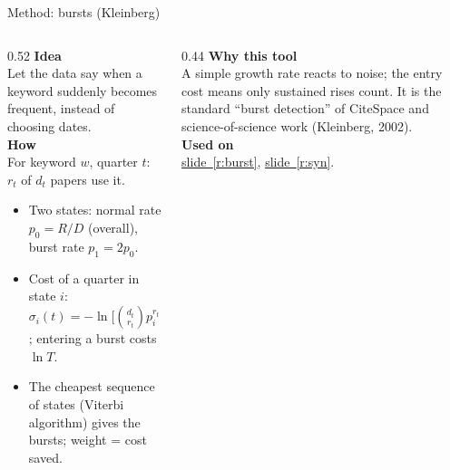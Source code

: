 \documentclass[aspectratio=169,10pt]{beamer}
\newcommand{\usedon}[1]{\hyperref[#1]{\textcolor{c4}{slide~\ref*{#1}}}}
\newcommand{\mhead}[1]{\textcolor{c1}{\textbf{#1}}\\[1pt]}
\begin{document}
\begin{frame}{Method: bursts (Kleinberg)}
\begin{columns}[T]
\begin{column}{0.52\textwidth}\footnotesize
\mhead{Idea}
Let the data say when a keyword suddenly becomes frequent, instead of choosing dates.\\[4pt]
\mhead{How}
For keyword $w$, quarter $t$: $r_t$ of $d_t$ papers use it.
\begin{itemize}\setlength\itemsep{1pt}
\item Two states: normal rate $p_0 = R/D$ (overall), burst rate $p_1 = 2p_0$.
\item Cost of a quarter in state $i$: $\sigma_i(t) = -\ln\big[\binom{d_t}{r_t} p_i^{r_t}(1-p_i)^{d_t-r_t}\big]$; entering a burst costs $\ln T$.
\item The cheapest sequence of states (Viterbi algorithm) gives the bursts; weight = cost saved.
\end{itemize}
\end{column}
\begin{column}{0.44\textwidth}\footnotesize
\mhead{Why this tool}
A simple growth rate reacts to noise; the entry cost means only sustained rises count. It is the standard ``burst detection'' of CiteSpace and science-of-science work (Kleinberg, 2002).\\[6pt]
\mhead{Used on}
\usedon{r:burst}, \usedon{r:syn}.
\end{column}
\end{columns}
\end{frame}
\end{document}
